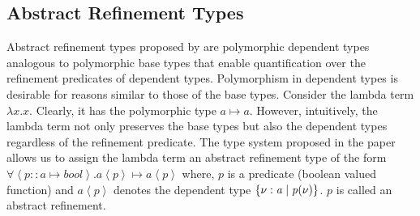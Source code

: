 \newcommand{\pr}[1]{\left< #1 \right>}
\newcommand{\lp}{\langle}
\newcommand{\rp}{\rangle}

\subsection{Abstract Refinement Types}

Abstract refinement types proposed by \cite{rjhala:ESOP13} are polymorphic dependent types analogous to polymorphic base types that enable quantification over the refinement predicates of dependent types. 
Polymorphism in dependent types is desirable for reasons similar to those of the base types. Consider the lambda term $\lambda x. x$. Clearly, it has the polymorphic 
type $a \mapsto a$. However, intuitively, the lambda term not only preserves the base types but also the dependent types regardless of the refinement predicate.
The type system proposed in the paper allows us to assign the lambda term an abstract refinement type of the form $\forall \pr{p::a \mapsto bool}. a\pr{p} \mapsto a\pr{p}$
where, $p$ is a predicate (boolean valued function) and $a\pr{p}$ denotes the dependent type $\mathit{\{ \nu:a \; | \; p(\nu)\}}$. $p$ is called an abstract refinement.

